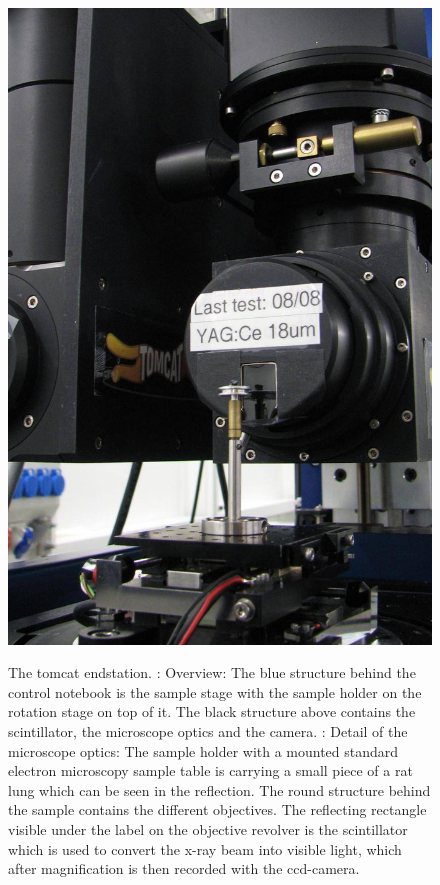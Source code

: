 \begin{figure}
{		\includegraphics[width=\imsize]{img/TOMCAT2}%
		\label{subfig:TOMCAT2}%
		}%
	\caption[The TOMCAT endstation]{The \ac{tomcat} endstation. : Overview: The blue structure behind the control notebook is the sample stage with the sample holder on the rotation stage on top of it. The black structure above contains the scintillator, the microscope optics and the camera. : Detail of the microscope optics: The sample holder with a mounted standard electron microscopy sample table is carrying a small piece of a rat lung which can be seen in the reflection. The round structure behind the sample contains the different objectives. The reflecting rectangle visible under the label on the objective revolver is the scintillator which is used to convert the x-ray beam into visible light, which after magnification is then recorded with the \ac{ccd}-camera.}%
	\label{fig:tomcat}
\end{figure}

